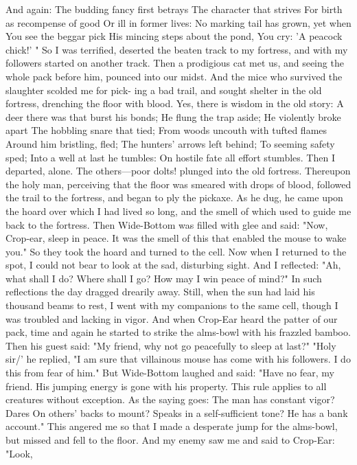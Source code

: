 \documentclass{book}
\begin{document}
And again:
The budding fancy first betrays
The character that strives
For birth as recompense of good
Or ill in former lives:
No marking tail has grown, yet when
You see the beggar pick
His mincing steps about the pond,
You cry: 'A peacock chick!' "
So I was terrified, deserted the beaten track to my
fortress, and with my followers started on another
track.
Then a prodigious cat met us, and seeing the whole
pack before him, pounced into our midst. And the
mice who survived the slaughter scolded me for pick-
ing a bad trail, and sought shelter in the old fortress,
drenching the floor with blood. Yes, there is wisdom
in the old story:
A deer there was that burst his bonds;
He flung the trap aside;
He violently broke apart
The hobbling snare that tied;
From woods uncouth with tufted flames
Around him bristling, fled;
The hunters' arrows left behind;
To seeming safety sped;
Into a well at last he tumbles:
On hostile fate all effort stumbles.
Then I departed, alone. The others---poor dolts!
plunged into the old fortress. Thereupon the holy
man, perceiving that the floor was smeared with
drops of blood, followed the trail to the fortress, and
began to ply the pickaxe. As he dug, he came upon
the hoard over which I had lived so long, and the
smell of which used to guide me back to the fortress.
Then Wide-Bottom was filled with glee and said:
"Now, Crop-ear, sleep in peace. It was the smell of
this that enabled the mouse to wake you." So they
took the hoard and turned to the cell.
Now when I returned to the spot, I could not bear
to look at the sad, disturbing sight. And I reflected:
"Ah, what shall I do? Where shall I go? How may I
win peace of mind?" In such reflections the day
dragged drearily away.
Still, when the sun had laid his thousand beams to
rest, I went with my companions to the same cell,
though I was troubled and lacking in vigor. And
when Crop-Ear heard the patter of our pack, time
and again he started to strike the alms-bowl with his
frazzled bamboo.
Then his guest said: "My friend, why not go
peacefully to sleep at last?" "Holy sir/' he replied,
"I am sure that villainous mouse has come with his
followers. I do this from fear of him."
But Wide-Bottom laughed and said: "Have no
fear, my friend. His jumping energy is gone with his
property. This rule applies to all creatures without
exception. As the saying goes:
The man has constant vigor? Dares
On others' backs to mount?
Speaks in a self-sufficient tone?
He has a bank account."
This angered me so that I made a desperate jump
for the alms-bowl, but missed and fell to the floor.
And my enemy saw me and said to Crop-Ear: "Look,
\end{document}
